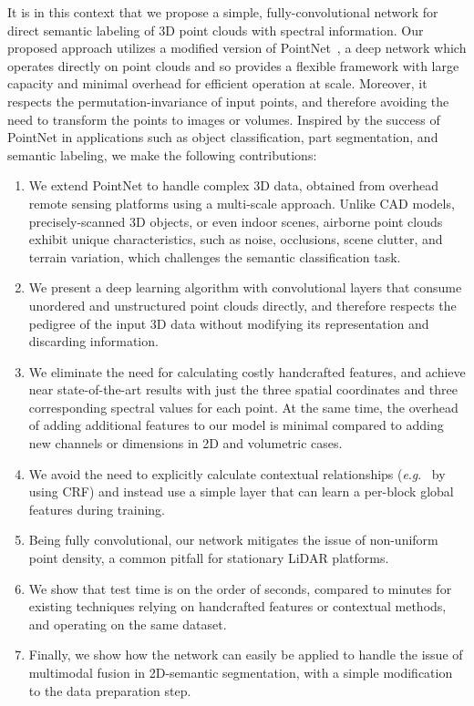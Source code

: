 \documentclass[final,3p,times,twocolumn,authoryear]{elsarticle}
\newcommand{\eg}{\textit{e}.\textit{g}.}
\begin{document}
It is in this context that we propose a simple, fully-convolutional network for direct semantic labeling of 3D point clouds with spectral information. 
Our proposed approach utilizes a modified version of PointNet~\citep{pointnet}, a deep network which operates directly on point clouds and so provides a flexible framework with large capacity and minimal overhead for efficient operation at scale. 
Moreover, it respects the permutation-invariance of input points, and therefore avoiding the need to transform the points to images or volumes. 
Inspired by the success of PointNet in applications such as object classification, part segmentation, and semantic labeling, we make the following contributions:
\begin{enumerate}
\item We extend PointNet to handle complex 3D data, obtained from overhead remote sensing platforms using a multi-scale approach.
Unlike CAD models, precisely-scanned 3D objects, or even indoor scenes, airborne point clouds exhibit unique characteristics, such as noise, occlusions, scene clutter, and terrain variation, which challenges the semantic classification task.
\item We present a deep learning algorithm with convolutional layers that consume unordered and unstructured point clouds directly, and therefore respects the pedigree of the input 3D data without modifying its representation and discarding information. 
\item We eliminate the need for calculating costly handcrafted features, and achieve near state-of-the-art results with just the three spatial coordinates and three corresponding spectral values for each point. At the same time, the overhead of adding additional features to our model is minimal compared to adding new channels or dimensions in 2D
and volumetric cases.
\item We avoid the need to explicitly calculate contextual relationships (\eg~ by using CRF) and instead use a simple layer that can learn a per-block global features during training. 
\item Being fully convolutional, our network mitigates the issue of non-uniform point density, a common pitfall for stationary LiDAR platforms. 
\item We show that test time is on the order of seconds, compared to minutes for existing techniques relying on handcrafted features or contextual methods, and operating on the same dataset.
\item Finally, we show how the network can easily be applied to handle the issue of multimodal fusion in 2D-semantic segmentation, with a simple modification to the data preparation step. 
\end{enumerate}
\end{document}
